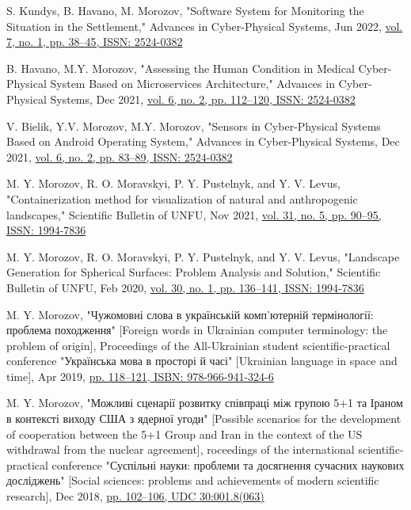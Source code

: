 \documentclass[letterpaper,10pt]{article}
\newcommand{\resumePublicationHeading}[3]{
    \item #1\href{#3}{{#2}} \vspace{-9pt}
}
\begin{document}
    \resumePublicationHeading
      {S. Kundys, B. Havano, M. Morozov, "Software System for Monitoring the Situation in the Settlement," Advances in Cyber-Physical Systems, Jun 2022, }
      {vol. 7, no. 1, pp. 38–45, ISSN: 2524-0382} 
      {https://doi.org/10.23939/acps2022.01.038}
		
    \resumePublicationHeading
      {B. Havano, M.Y. Morozov, "Assessing the Human Condition in Medical Cyber-Physical System Based on Microservices Architecture," Advances in Cyber-Physical Systems, Dec 2021, }
      {vol. 6, no. 2, pp. 112–120, ISSN: 2524-0382} 
      {https://doi.org/10.23939/acps2021.02.112}
		
    \resumePublicationHeading
      {V. Bielik, Y.V. Morozov, M.Y. Morozov, "Sensors in Cyber-Physical Systems Based on Android Operating System," Advances in Cyber-Physical Systems, Dec 2021, }
      {vol. 6, no. 2, pp. 83–89, ISSN: 2524-0382} 
      {https://doi.org/10.23939/acps2021.02.083}
		
    \resumePublicationHeading
      {M. Y. Morozov, R. O. Moravskyi, P. Y. Pustelnyk, and Y. V. Levus, "Containerization method for visualization of natural and anthropogenic landscapes," Scientific Bulletin of UNFU, Nov 2021, }
      {vol. 31, no. 5, pp. 90–95, ISSN: 1994-7836} 
      {https://doi.org/10.36930/40310514}
		
    \resumePublicationHeading
      {M. Y. Morozov, R. O. Moravskyi, P. Y. Pustelnyk, and Y. V. Levus, "Landscape Generation for Spherical Surfaces: Problem Analysis and Solution," Scientific Bulletin of UNFU, Feb 2020, }
      {vol. 30, no. 1, pp. 136–141, ISSN: 1994-7836} 
      {https://doi.org/10.36930/40300124}
		
    \resumePublicationHeading
      {M. Y. Morozov, "Чужомовні слова в українській комп’ютерній термінології: проблема походження" [Foreign words in Ukrainian computer terminology: the problem of origin], Proceedings of the All-Ukrainian student scientific-practical conference "Українська мова в просторі й часі" [Ukrainian language in space and time], Apr 2019, }
      {pp. 118–121, ISBN: 978-966-941-324-6} 
      {}
		
    \resumePublicationHeading
      {M. Y. Morozov, "Можливі сценарії розвитку співпраці між групою 5+1 та Іраном в контексті виходу США з ядерної угоди" [Possible scenarios for the development of cooperation between the 5+1 Group and Iran in the context of the US withdrawal from the nuclear agreement], roceedings of the international scientific-practical conference "Суспільні науки: проблеми та досягнення сучасних наукових досліджень" [Social sciences: problems and achievements of modern scientific research], Dec 2018, }
      {pp. 102–106, UDC 30:001.8(063)} 
      {}
		
\end{document}
